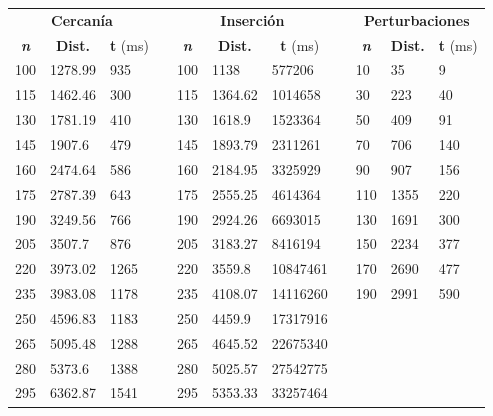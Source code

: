 \documentclass[10pt, a4paper]{article}
\theoremstyle{theorem-style}
\theoremstyle{theorem-style}
\theoremstyle{definition-style}
\theoremstyle{remark-style}
\theoremstyle{example-style}
\theoremstyle{definition-style}
\theoremstyle{remark-style}
\begin{document}
\begin{table}[h]
\centering
\begin{tabular}{|r|l|l|l|l|l|l|l|l|l|l|}
\cline{1-3} \cline{5-7} \cline{9-11}
\multicolumn{3}{c}{\cellcolor[HTML]{4DB6AC}\textbf{Cercanía}} & & \multicolumn{3}{c}{\cellcolor[HTML]{4DB6AC}\textbf{Inserción}} &&\multicolumn{3}{c}{\cellcolor[HTML]{4DB6AC}\textbf{Perturbaciones}}\\
\cline{1-3} \cline{5-7} \cline{9-11}
\multicolumn{1}{c}{\cellcolor[HTML]{80CBC4}\textbf{\emph{n}}} & \multicolumn{1}{c}{\cellcolor[HTML]{80CBC4}\textbf{Dist.}} & \multicolumn{1}{c}{\cellcolor[HTML]{80CBC4}\textbf{t} (ms)} & & \multicolumn{1}{c}{\cellcolor[HTML]{80CBC4}\textbf{\emph{n}}} & \multicolumn{1}{c}{\cellcolor[HTML]{80CBC4}\textbf{Dist.}} & \multicolumn{1}{c}{\cellcolor[HTML]{80CBC4}\textbf{t} (ms)}&&\multicolumn{1}{c}{\cellcolor[HTML]{80CBC4}\textbf{\emph{n}}} & \multicolumn{1}{c}{\cellcolor[HTML]{80CBC4}\textbf{Dist.}} & \multicolumn{1}{c}{\cellcolor[HTML]{80CBC4}\textbf{t} (ms)}\\
\cline{1-3} \cline{5-7} \cline{9-11}
100&1278.99&935 & &100&1138&577206 &&10&35&9  \\
115&1462.46& 300&&115&1364.62&1014658 &&30&223&40 \\
130&1781.19&410&&130&1618.9&1523364 &&50&409 &91\\
145&1907.6&479&&145&1893.79&2311261&&70&706&140\\
160&2474.64&586&&160&2184.95&3325929 &&90&907&156\\
175&2787.39&643&&175&2555.25&4614364  &&110&1355&220\\
190&3249.56&766&&190&2924.26&6693015  &&130&1691&300\\
205&3507.7&876&&205&3183.27&8416194  &&150&2234&377\\
220&3973.02&1265 &&220&3559.8&10847461&&170&2690&477\\
235&3983.08&1178 &&235&4108.07&14116260 &&190&2991&590\\
\cline{9-11}
250& 4596.83&1183&&250&4459.9&17317916\\
265&5095.48& 1288&&265&4645.52&22675340\\
280&5373.6&1388&&280&5025.57&27542775 \\ 
295&6362.87&1541 &&295&5353.33&33257464\\
 \cline{1-3} \cline{5-7}
 
\end{tabular}
\end{table}
\vspace{0.5cm}
\pagebreak
\begin{center}
\end{center}
\end{document}
